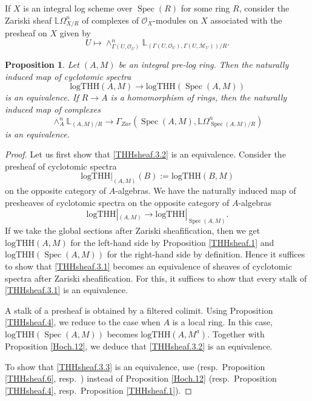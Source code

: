 \documentclass[11pt, a4paper]{amsart}
\newtheorem{prop}[thm]{Proposition}
\theoremstyle{definition}
\numberwithin{equation}{subsection}
\newcommand{\bbL}{\mathbb{L}}
\providecommand{\Spec}[1]{\operatorname{Spec}(#1)} 	%
\newcommand{\logTHH}{\mathrm{logTHH}}
\newcommand{\cM}{\mathcal{M}}
\newcommand{\cO}{\mathcal{O}}
\begin{document}
If $X$ is an integral log scheme over $\Spec{R}$ for some ring $R$,
consider the Zariski sheaf $\bbL\Omega^n_{X/R}$ of complexes of $\cO_X$-modules on $X$ associated with the presheaf on $X$ given by
\[
U\mapsto \wedge_{\Gamma(U,\cO_U)}^{n}\bbL_{(\Gamma(U,\cO_U),\Gamma(U,\cM_U))/R}.
\]


\begin{prop}
\label{THHsheaf.3}
Let $(A,M)$ be an integral pre-log ring.
Then the naturally induced map of cyclotomic spectra
\begin{equation}
\label{THHsheaf.3.2}
\logTHH(A,M)
\to
\logTHH(\Spec{A,M})
\end{equation}
is an equivalence.
If $R\to A$ is a homomorphism of rings,
then the naturally induced map of complexes
\begin{equation}
\label{THHsheaf.3.3}
\wedge_A^n
\bbL_{(A,M)/R}
\to
\Gamma_{Zar}(\Spec{A,M},\bbL\Omega_{\Spec{A,M}/R}^n)
\end{equation}
is an equivalence.
\end{prop}
\begin{proof}
Let us first show that \eqref{THHsheaf.3.2} is an equivalence.
Consider the presheaf of cyclotomic spectra
\[
\logTHH|_{(A,M)}(B)
:=
\logTHH(B,M)
\]
on the opposite category of $A$-algebras.
We have the naturally induced map of presheaves of cyclotomic spectra on the opposite category of $A$-algebras
\begin{equation}
\label{THHsheaf.3.1}
\logTHH|_{(A,M)}
\to
\logTHH|_{\Spec{A,M}}.
\end{equation}
If we take the global sections after Zariski sheafification,
then we get $\logTHH(A,M)$ for the left-hand side by Proposition \ref{THHsheaf.1} and $\logTHH(\Spec{A,M})$ for the right-hand side by definition.
Hence it suffices to show that \eqref{THHsheaf.3.1} becomes an equivalence of sheaves of cyclotomic spectra after Zariski sheafification.
For this,
it suffices to show that every stalk of \eqref{THHsheaf.3.1} is an equivalence.


A stalk of a presheaf is obtained by a filtered colimit.
Using Proposition \ref{THHsheaf.4},
we reduce to the case when $A$ is a local ring.
In this case, $\logTHH(\Spec{A,M})$ becomes $\logTHH(A,M^a)$.
Together with Proposition \ref{Hoch.12},
we deduce that \eqref{THHsheaf.3.2} is an equivalence.

To show that \eqref{THHsheaf.3.3} is an equivalence,
use \cite[Lemma 3.11]{BLPO} (resp.\ Proposition \ref{THHsheaf.6}, resp.\ \cite[Theorem 2.3]{BLPO}) instead of Proposition \ref{Hoch.12} (resp.\ Proposition \ref{THHsheaf.4}, resp.\ Proposition \ref{THHsheaf.1}).
\end{proof}
\end{document}
